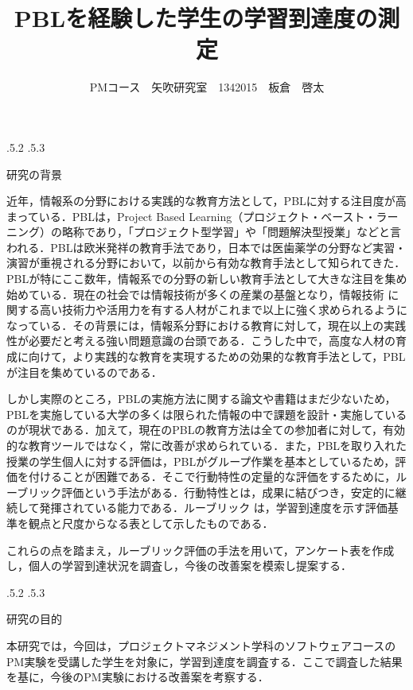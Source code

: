 \documentclass[uplatex]{jsarticle}
\title{\vspace{-14mm}PBLを経験した学生の学習到達度の測定}
\author{PMコース　矢吹研究室　1342015　板倉　啓太}
\date{}%
\makeatletter
\renewcommand{\section}{%
    \if@slide\clearpage\fi
    \@startsection{section}{1}{\z@}%
    {\Cvs \@plus.5\Cdp \@minus.2\Cdp}%
    {.5\Cvs \@plus.3\Cdp}%
    {\normalfont\raggedright}}
\makeatother
\begin{document}
\maketitle





\section{研究の背景}

近年，情報系の分野における実践的な教育方法として，PBLに対する注目度が高まっている\cite{PBL}\cite{PBL1}．PBLは，Project Based Learning（プロジェクト・ベースト・ラーニング）の略称であり，「プロジェクト型学習」や「問題解決型授業」などと言われる．PBLは欧米発祥の教育手法であり，日本では医歯薬学の分野など実習・演習が重視される分野において，以前から有効な教育手法として知られてきた．PBLが特にここ数年，情報系での分野の新しい教育手法として大きな注目を集め始めている．現在の社会では情報技術が多くの産業の基盤となり，情報技術 に関する高い技術力や活用力を有する人材がこれまで以上に強く求められるようになっている．その背景には，情報系分野における教育に対して，現在以上の実践性が必要だと考える強い問題意識の台頭である．こうした中で，高度な人材の育成に向けて，より実践的な教育を実現するための効果的な教育手法として，PBLが注目を集めているのである．

しかし実際のところ，PBLの実施方法に関する論文や書籍はまだ少ないため，PBLを実施している大学の多くは限られた情報の中で課題を設計・実施しているのが現状である．加えて，現在のPBLの教育方法は全ての参加者に対して，有効的な教育ツールではなく，常に改善が求められている．また，PBLを取り入れた授業の学生個人に対する評価は，PBLがグループ作業を基本としているため，評価を付けることが困難である．そこで行動特性の定量的な評価をするために，ルーブリック評価という手法がある\cite{ルーブリック評価}．行動特性とは，成果に結びつき，安定的に継続して発揮されている能力である．ルーブリック は，学習到達度を示す評価基準を観点と尺度からなる表として示したものである．

これらの点を踏まえ，ルーブリック評価の手法を用いて，アンケート表を作成し，個人の学習到達状況を調査し，今後の改善案を模索し提案する．




\section{研究の目的}

本研究では，今回は，プロジェクトマネジメント学科のソフトウェアコースのPM実験を受講した学生を対象に，学習到達度を調査する．ここで調査した結果を基に，今後のPM実験における改善案を考察する．
\end{document}

